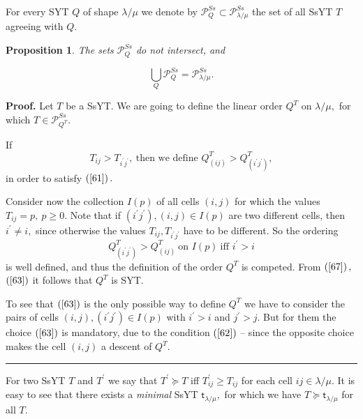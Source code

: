 \documentclass[12pt]{article}%
\newtheorem{proposition}[theorem]{Proposition}
\newenvironment{proof}[1][Proof]{\noindent\textbf{#1.} }{\ \rule{0.5em}{0.5em}}
\begin{document}
For every SYT $Q$ of shape $\lambda/\mu$ we denote by $\mathcal{P}_{Q}%
^{Ss}\subset\mathcal{P}_{\lambda/\mu}^{Ss}$ the set of all SsYT $T$ agreeing
with $Q.$

\begin{proposition}
The sets $\mathcal{P}_{Q}^{Ss}$ do not intersect, and%

\[
\bigcup_{Q}\mathcal{P}_{Q}^{Ss}=\mathcal{P}_{\lambda/\mu}^{Ss}.
\]

\end{proposition}

\begin{proof}
Let $T$ be a SsYT. We are going to define the linear order $Q^{T}$ on
$\lambda/\mu,$ for which $T\in\mathcal{P}_{Q^{T}}^{Ss}.$

If
\begin{equation}
T_{ij}>T_{i^{\prime}j^{\prime}},\ \text{then we define }Q_{\left(  ij\right)
}^{T}>Q_{\left(  i^{\prime}j^{\prime}\right)  }^{T}, \label{67}%
\end{equation}
in order to satisfy $\left(  \ref{61}\right)  .$

Consider now the collection $I\left(  p\right)  $ of all cells $\left(
i,j\right)  $ for which the values $T_{ij}=p,\ p\geq0.$ Note that if $\left(
i^{\prime}j^{\prime}\right)  ,\left(  i,j\right)  \in I\left(  p\right)  $ are
two different cells, then $i^{\prime}\neq i,$ since otherwise the values
$T_{ij},T_{i^{\prime}j^{\prime}}$ have to be different. So the ordering
\begin{equation}
Q_{\left(  i^{\prime}j^{\prime}\right)  }^{T}>Q_{\left(  ij\right)  }%
^{T}\ \text{on }I\left(  p\right)  \ \text{iff }i^{\prime}>i \label{63}%
\end{equation}
is well defined, and thus the definition of the order $Q^{T}$ is competed.
From $\left(  \ref{67}\right)  ,$ $\left(  \ref{63}\right)  $ it follows that
$Q^{T}$ is SYT.

To see that $\left(  \ref{63}\right)  $ is the only possible way to define
$Q^{T}$ we have to consider the pairs of cells $\left(  i,j\right)  ,\left(
i^{\prime}j^{\prime}\right)  \in I\left(  p\right)  $ with $i^{\prime}>i$ and
$j^{\prime}>j.$ But for them the choice $\left(  \ref{63}\right)  $ is
mandatory, due to the condition $\left(  \ref{62}\right)  $ -- since the
opposite choice makes the cell $\left(  i,j\right)  $ a descent of $Q^{T}.$
\end{proof}

For two SsYT $T$ and $T^{\prime}$ we say that $T^{\prime}\succeq T$ iff
$T_{ij}^{\prime}\geq T_{ij}$ for each cell $ij\in\lambda/\mu.$ It is easy to
see that there exists a \textit{minimal} SsYT $\mathsf{t}_{\lambda/\mu},$ for
which we have $T\succeq\mathsf{t}_{\lambda/\mu}$ for all $T.$
\end{document}
